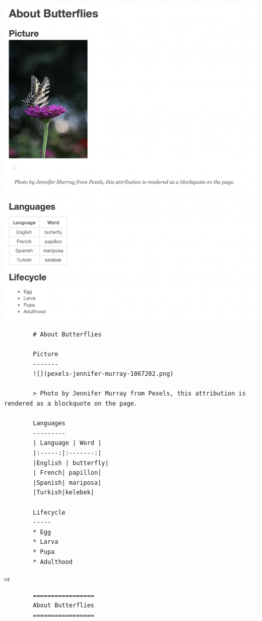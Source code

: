\documentclass[10pt]{article}
\begin{document}
\begin{enumerate}
    \centerline{
    	\includegraphics[width=6in]{page}
    }

\newpage
    
    \beginanswers
    \begin{lstlisting}
    	# About Butterflies
    	
    	Picture
    	-------
    	![](pexels-jennifer-murray-1067202.png)
    	
    	> Photo by Jennifer Murray from Pexels, this attribution is rendered as a blockquote on the page.
    	
    	Languages
    	---------
    	| Language | Word |
    	|:-----:|:-------:|
    	|English | butterfly|
    	| French| papillon|
    	|Spanish| mariposa|
    	|Turkish|kelebek|
    	
    	Lifecycle
    	-----
    	* Egg
    	* Larva
    	* Pupa
    	* Adulthood
    	\end{lstlisting}
    or
    \begin{lstlisting}
    	=================
    	About Butterflies
    	=================
    	

\end{lstlisting}
\end{enumerate}
\end{document}

